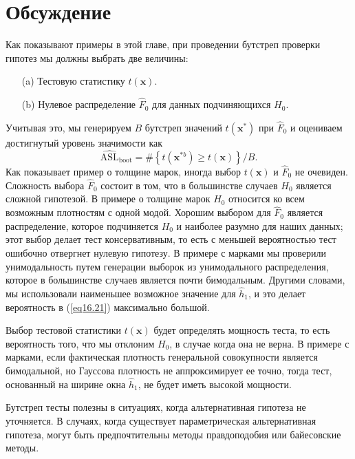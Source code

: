 \section{Обсуждение}

Как показывают примеры в этой главе, при проведении бутстреп проверки гипотез мы должны выбрать две величины:
\begin{enumerate}
    \item[(a)] Тестовую статистику $t(\mathbf{x})$.
    \item[(b)] Нулевое распределение $\hat{F}_0$ для данных подчиняющихся $H_0$.
\end{enumerate}

Учитывая это, мы генерируем $B$ бутстреп значений $t(\mathbf{x}^{*})$ при $\hat{F}_0$ и оцениваем достигнутый уровень значимости как
\begin{equation}\label{eq16.24}
    \widehat{\text{ASL}}_{\text{boot}} = \#\left\{t(\mathbf{x}^{*b}) \geq t(\mathbf{x})\right\}/B.
\end{equation}
Как показывает пример о толщине марок, иногда выбор $t(\mathbf{x})$ и $\hat{F}_0$ не очевиден. Сложность выбора $\hat{F}_0$ состоит в том, что в большинстве случаев $H_0$ является сложной гипотезой. В примере о толщине марок $H_0$ относится ко всем возможным плотностям с одной модой. Хорошим выбором для $\hat{F}_0$ является распределение, которое подчиняется $H_0$ и наиболее разумно для наших данных; этот выбор делает тест консервативным, то есть с меньшей вероятностью тест ошибочно отвергнет нулевую гипотезу. В примере с марками мы проверили унимодальность путем генерации выборок из унимодального распределения, которое в большинстве случаев является почти бимодальным. Другими словами, мы использовали наименьшее возможное значение для $\hat{h}_1$, и это делает вероятность в (\ref{eq16.21}) максимально большой.

Выбор тестовой статистики $t(\mathbf{x})$ будет определять мощность теста, то есть вероятность того, что мы отклоним $H_0$, в случае когда она не верна. В примере с марками, если фактическая плотность генеральной совокупности является бимодальной, но Гауссова плотность не аппроксимирует ее точно, тогда тест, основанный на ширине окна $\hat{h}_1$, не будет иметь высокой мощности.

Бутстреп тесты полезны в ситуациях, когда альтернативная гипотеза не уточняется. В случаях, когда существует параметрическая альтернативная гипотеза, могут быть предпочтительны методы правдоподобия или байесовские методы.